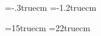 

\headheight=12pt
\footskip=48pt
\hoffset=-.3truecm          %
\voffset=-1.2truecm

\textwidth=15truecm
\textheight=22truecm


\setcounter{page}{0}

\tableofcontents  
{}




\begin{thebibliography}{10}      %

\end{thebibliography}             %


\endinput

